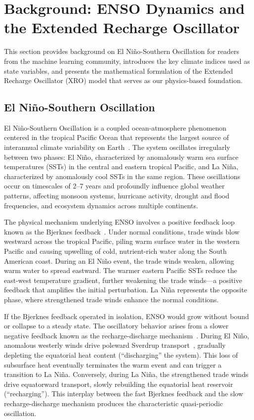 \section{Background: ENSO Dynamics and the Extended Recharge Oscillator}
\label{sec:background}

This section provides background on El Ni\~no-Southern Oscillation for readers from the machine learning community, introduces the key climate indices used as state variables, and presents the mathematical formulation of the Extended Recharge Oscillator (XRO) model that serves as our physics-based foundation.

\subsection{El Ni\~no-Southern Oscillation}

El Ni\~no-Southern Oscillation is a coupled ocean-atmosphere phenomenon centered in the tropical Pacific Ocean that represents the largest source of interannual climate variability on Earth~\cite{mcphaden2006enso,timmermann2018enso}. The system oscillates irregularly between two phases: El Ni\~no, characterized by anomalously warm sea surface temperatures (SSTs) in the central and eastern tropical Pacific, and La Ni\~na, characterized by anomalously cool SSTs in the same region. These oscillations occur on timescales of 2--7 years and profoundly influence global weather patterns, affecting monsoon systems, hurricane activity, drought and flood frequencies, and ecosystem dynamics across multiple continents.

The physical mechanism underlying ENSO involves a positive feedback loop known as the Bjerknes feedback~\cite{bjerknes1969atmospheric}. Under normal conditions, trade winds blow westward across the tropical Pacific, piling warm surface water in the western Pacific and causing upwelling of cold, nutrient-rich water along the South American coast. During an El Ni\~no event, the trade winds weaken, allowing warm water to spread eastward. The warmer eastern Pacific SSTs reduce the east-west temperature gradient, further weakening the trade winds---a positive feedback that amplifies the initial perturbation. La Ni\~na represents the opposite phase, where strengthened trade winds enhance the normal conditions.

If the Bjerknes feedback operated in isolation, ENSO would grow without bound or collapse to a steady state. The oscillatory behavior arises from a slower negative feedback known as the recharge-discharge mechanism~\cite{jin1997equatorial}. During El Ni\~no, anomalous westerly winds drive poleward Sverdrup transport~\cite{sverdrup1947wind}, gradually depleting the equatorial heat content (``discharging'' the system). This loss of subsurface heat eventually terminates the warm event and can trigger a transition to La Ni\~na. Conversely, during La Ni\~na, the strengthened trade winds drive equatorward transport, slowly rebuilding the equatorial heat reservoir (``recharging''). This interplay between the fast Bjerknes feedback and the slow recharge-discharge mechanism produces the characteristic quasi-periodic oscillation.

